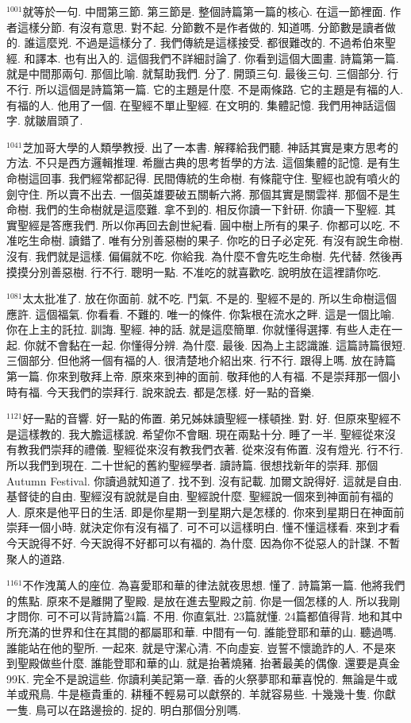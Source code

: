 \documentclass{book}
\begin{document}
$^{1001}$就等於一句.
中間第三節.
第三節是.
整個詩篇第一篇的核心.
在這一節裡面.
作者這樣分節.
有沒有意思.
對不起.
分節數不是作者做的.
知道嗎.
分節數是讀者做的.
誰這麼兇.
不過是這樣分了.
我們傳統是這樣接受.
都很難改的.
不過希伯來聖經.
和譯本.
也有出入的.
這個我們不詳細討論了.
你看到這個大圖畫.
詩篇第一篇.
就是中間那兩句.
那個比喻.
就幫助我們.
分了.
開頭三句.
最後三句.
三個部分.
行不行.
所以這個是詩篇第一篇.
它的主題是什麼.
不是兩條路.
它的主題是有福的人.
有福的人.
他用了一個.
在聖經不單止聖經.
在文明的.
集體記憶.
我們用神話這個字.
就皺眉頭了.

$^{1041}$芝加哥大學的人類學教授.
出了一本書.
解釋給我們聽.
神話其實是東方思考的方法.
不只是西方邏輯推理.
希臘古典的思考哲學的方法.
這個集體的記憶.
是有生命樹這回事.
我們經常都記得.
民間傳統的生命樹.
有條龍守住.
聖經也說有噴火的劍守住.
所以賣不出去.
一個英雄要破五關斬六將.
那個其實是關雲祥.
那個不是生命樹.
我們的生命樹就是這麼難.
拿不到的.
相反你讀一下針研.
你讀一下聖經.
其實聖經是答應我們.
所以你再回去創世紀看.
圓中樹上所有的果子.
你都可以吃.
不准吃生命樹.
讀錯了.
唯有分別善惡樹的果子.
你吃的日子必定死.
有沒有說生命樹.
沒有.
我們就是這樣.
偏偏就不吃.
你給我.
為什麼不會先吃生命樹.
先代替.
然後再摸摸分別善惡樹.
行不行.
聰明一點.
不准吃的就喜歡吃.
說明放在這裡請你吃.

$^{1081}$太太批准了.
放在你面前.
就不吃.
鬥氣.
不是的.
聖經不是的.
所以生命樹這個應許.
這個福氣.
你看看.
不難的.
唯一的條件.
你紮根在流水之畔.
這是一個比喻.
你在上主的託拉.
訓誨.
聖經.
神的話.
就是這麼簡單.
你就懂得選擇.
有些人走在一起.
你就不會黏在一起.
你懂得分辨.
為什麼.
最後.
因為上主認識誰.
這篇詩篇很短.
三個部分.
但他將一個有福的人.
很清楚地介紹出來.
行不行.
跟得上嗎.
放在詩篇第一篇.
你來到敬拜上帝.
原來來到神的面前.
敬拜他的人有福.
不是崇拜那一個小時有福.
今天我們的崇拜行.
說來說去.
都是怎樣.
好一點的音樂.

$^{1121}$好一點的音響.
好一點的佈置.
弟兄姊妹讀聖經一樣頓挫.
對.
好.
但原來聖經不是這樣教的.
我大膽這樣說.
希望你不會睏.
現在兩點十分.
睡了一半.
聖經從來沒有教我們崇拜的禮儀.
聖經從來沒有教我們衣著.
從來沒有佈置.
沒有燈光.
行不行.
所以我們到現在.
二十世紀的舊約聖經學者.
讀詩篇.
很想找新年的崇拜.
那個Autumn Festival.
你讀過就知道了.
找不到.
沒有記載.
加爾文說得好.
這就是自由.
基督徒的自由.
聖經沒有說就是自由.
聖經說什麼.
聖經說一個來到神面前有福的人.
原來是他平日的生活.
即是你星期一到星期六是怎樣的.
你來到星期日在神面前崇拜一個小時.
就決定你有沒有福了.
可不可以這樣明白.
懂不懂這樣看.
來到才看今天說得不好.
今天說得不好都可以有福的.
為什麼.
因為你不從惡人的計謀.
不暫聚人的道路.

$^{1161}$不作洩萬人的座位.
為喜愛耶和華的律法就夜思想.
懂了.
詩篇第一篇.
他將我們的焦點.
原來不是離開了聖殿.
是放在進去聖殿之前.
你是一個怎樣的人.
所以我剛才問你.
可不可以背詩篇24篇.
不用.
你直氣壯.
23篇就懂.
24篇都值得背.
地和其中所充滿的世界和住在其間的都屬耶和華.
中間有一句.
誰能登耶和華的山.
聽過嗎.
誰能站在他的聖所.
一起來.
就是守潔心清.
不向虛妄.
豈誓不懷詭詐的人.
不是來到聖殿做些什麼.
誰能登耶和華的山.
就是抬著燒豬.
抬著最美的偶像.
還要是真金99K.
完全不是說這些.
你讀利美記第一章.
香的火祭夢耶和華喜悅的.
無論是牛或羊或飛鳥.
牛是極貴重的.
耕種不輕易可以獻祭的.
羊就容易些.
十幾幾十隻.
你獻一隻.
鳥可以在路邊撿的.
捉的.
明白那個分別嗎.
\end{document}
